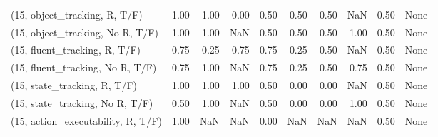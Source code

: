 \begin{table*}[h!]
\begin{adjustbox}{width=2\columnwidth,center}
\begin{tabular}{lrrr|rrr|rrr}
\midrule
(15, object\_tracking, R, T/F)         &                      1.00 &                  1.00 &                      0.00 &                          0.50 &                      0.50 &                          0.50 &                                    NaN &                               0.50 &                                  None \\
(15, object\_tracking, No R, T/F)      &                      1.00 &                  1.00 &                       NaN &                          0.50 &                      0.50 &                          0.50 &                                   1.00 &                               0.50 &                                  None \\
(15, fluent\_tracking, R, T/F)         &                      0.75 &                  0.25 &                      0.75 &                          0.75 &                      0.25 &                          0.50 &                                    NaN &                               0.50 &                                  None \\
(15, fluent\_tracking, No R, T/F)      &                      0.75 &                  1.00 &                       NaN &                          0.75 &                      0.25 &                          0.50 &                                   0.75 &                               0.50 &                                  None \\
(15, state\_tracking, R, T/F)          &                      1.00 &                  1.00 &                      1.00 &                          0.50 &                      0.00 &                          0.00 &                                    NaN &                               0.50 &                                  None \\
(15, state\_tracking, No R, T/F)       &                      0.50 &                  1.00 &                       NaN &                          0.50 &                      0.00 &                          0.00 &                                   1.00 &                               0.50 &                                  None \\
(15, action\_executability, R, T/F)    &                      1.00 &                   NaN &                       NaN &                          0.00 &                       NaN &                           NaN &                                    NaN &                               0.50 &                                  None \\

\end{tabular}
\end{adjustbox}
\end{table*}
